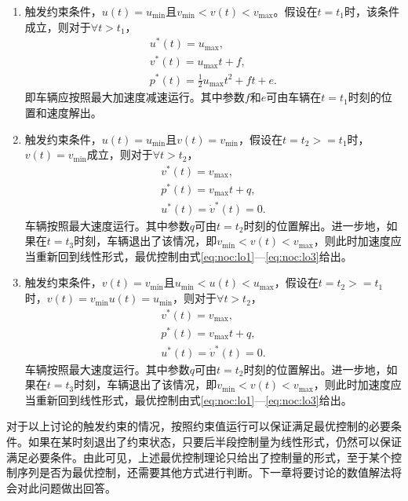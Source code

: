 \begin{enumerate}[label=(\arabic*)]
\item 触发约束条件，$u(t)=u_{\min}$且$v_{\min}<v(t)<v_{\max}$。假设在$t=t_1$时，该条件成立，则对于$\forall t>t_1$，
\begin{gather}
u^*(t)=u_{\max},\\
v^*(t)=u_{\max}t+f,\\
p^*(t)=\frac12u_{\max}t^2+ft+e.
\end{gather}
即车辆应按照最大加速度减速运行。其中参数$f$和$e$可由车辆在$t=t_1$时刻的位置和速度解出。
\item 触发约束条件，$u(t)=u_{\min}$且$v(t)=v_{\min}$，假设在$t=t_2>=t_1$时，$v(t)=v_{\min}$成立，则对于$\forall t>t_2$，
\begin{gather}
v^*(t)=v_{\max},\\
p^*(t)=v_{\max}t+q,\\
u^*(t)=\dot{v}^*(t)=0.
\end{gather}
车辆按照最大速度运行。其中参数$q$可由$t=t_2$时刻的位置解出。进一步地，如果在$t=t_3$时刻，车辆退出了该情况，即$v_{\min}<v(t)<v_{\max}$，则此时加速度应当重新回到线性形式，最优控制由式\ref{eq:noc:lo1}---\ref{eq:noc:lo3}给出。
\item 触发约束条件，$v(t)=v_{\min}$且$u_{\min}<u(t)<u_{\max}$，假设在$t=t_2>=t_1$时，$v(t)=v_{\min}$$u(t)=u_{\min}$，则对于$\forall t>t_2$，
\begin{gather}
v^*(t)=v_{\max},\\
p^*(t)=v_{\max}t+q,\\
u^*(t)=\dot{v}^*(t)=0.
\end{gather}
车辆按照最大速度运行。其中参数$q$可由$t=t_2$时刻的位置解出。进一步地，如果在$t=t_3$时刻，车辆退出了该情况，即$v_{\min}<v(t)<v_{\max}$，则此时加速度应当重新回到线性形式，最优控制由式\ref{eq:noc:lo1}---\ref{eq:noc:lo3}给出。
\end{enumerate}
\begin{remark}
对于以上讨论的触发约束的情况，按照约束值运行可以保证满足最优控制的必要条件。如果在某时刻退出了约束状态，只要后半段控制量为线性形式，仍然可以保证满足必要条件。由此可见，上述最优控制理论只给出了控制量的形式，至于某个控制序列是否为最优控制，还需要其他方式进行判断。下一章将要讨论的数值解法将会对此问题做出回答。
\end{remark}
